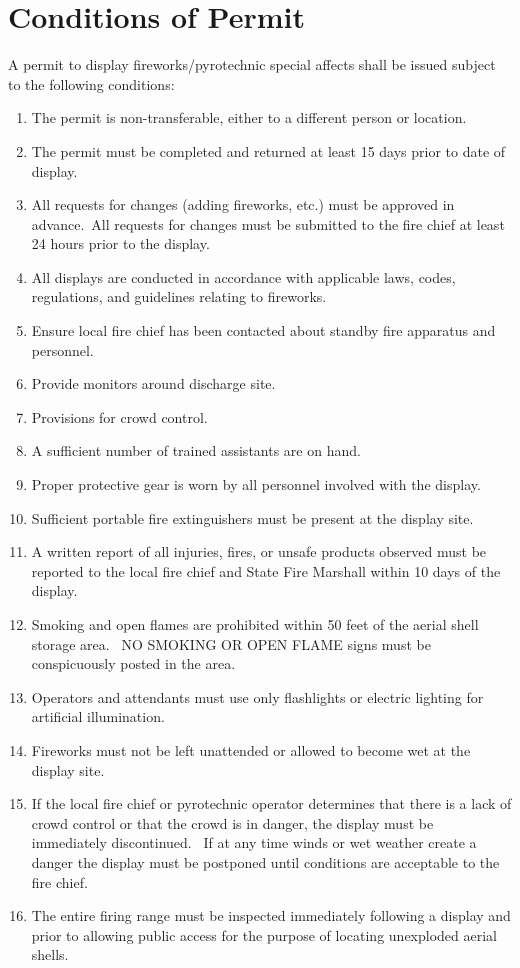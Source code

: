 \section{Conditions of Permit}
A permit to display fireworks/pyrotechnic special affects shall be issued subject to the following conditions:
\begin{enumerate}[{\indent}A)]
    \item The permit is non-transferable, either to a different person or location. 
    \item The permit must be completed and returned at least 15 days prior to date of display. 
    \item All requests for changes (adding fireworks, etc.) must be approved in advance. All requests for changes must be submitted to the fire chief at least 24 hours prior to the display. 
    \item All displays are conducted in accordance with applicable laws, codes, regulations, and guidelines relating to fireworks. 
    \item Ensure local fire chief has been contacted about standby fire apparatus and personnel.
    \item Provide monitors around discharge site. 
    \item Provisions for crowd control. 
    \item A sufficient number of trained assistants are on hand. 
    \item Proper protective gear is worn by all personnel involved with the display. 
    \item Sufficient portable fire extinguishers must be present at the display site. 
    \item A written report of all injuries, fires, or unsafe products observed must be reported to the local fire chief and State Fire Marshall within 10 days of the display. 
    \item Smoking and open flames are prohibited within 50 feet of the aerial shell storage area.  NO SMOKING OR OPEN FLAME signs must be conspicuously posted in the area.
    \item Operators and attendants must use only flashlights or electric lighting for artificial illumination.  
    \item Fireworks must not be left unattended or allowed to become wet at the display site. 
    \item If the local fire chief or pyrotechnic operator determines that there is a lack of crowd control or that the crowd is in danger, the display must be immediately discontinued.  If at any time winds or wet weather create a danger the display must be postponed until conditions are acceptable to the fire chief. 
    \item The entire firing range must be inspected immediately following a display and prior to allowing public access for the purpose of locating unexploded aerial shells. 
\end{enumerate}

